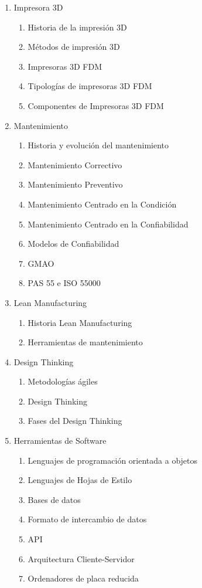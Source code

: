 		\begin{enumerate}
			\item Impresora 3D
				\begin{enumerate}
					\item Historia de la impresión 3D	
					\item Métodos de impresión 3D
					\item Impresoras 3D FDM
					\item Tipologías de impresoras 3D FDM 
					\item Componentes de Impresoras 3D FDM	
				\end{enumerate}
			\item Mantenimiento
				\begin{enumerate}
					\item Historia y evolución del mantenimiento
					\item Mantenimiento Correctivo
					\item Mantenimiento Preventivo
					\item Mantenimiento Centrado en la Condición
					\item Mantenimiento Centrado en la Confiabilidad
					\item Modelos de Confiabilidad
					\item GMAO 
					\item PAS 55 e ISO 55000
					
				\end{enumerate}					
			\item Lean Manufacturing
				\begin{enumerate}
					\item Historia Lean Manufacturing
					\item Herramientas de mantenimiento
				\end{enumerate}
			\item Design Thinking
				\begin{enumerate}
					\item Metodologías ágiles								\item Design Thinking
					\item Fases del Design Thinking
					
				\end{enumerate}
			\item Herramientas de Software
				\begin{enumerate}	
					\item Lenguajes de programación orientada a objetos
					\item Lenguajes de Hojas de Estilo
					\item Bases de datos 
					\item Formato de intercambio de datos
					\item API  
					\item Arquitectura Cliente-Servidor
					\item Ordenadores de placa reducida 
				\end{enumerate}						
		\end{enumerate}
		\clearpage

